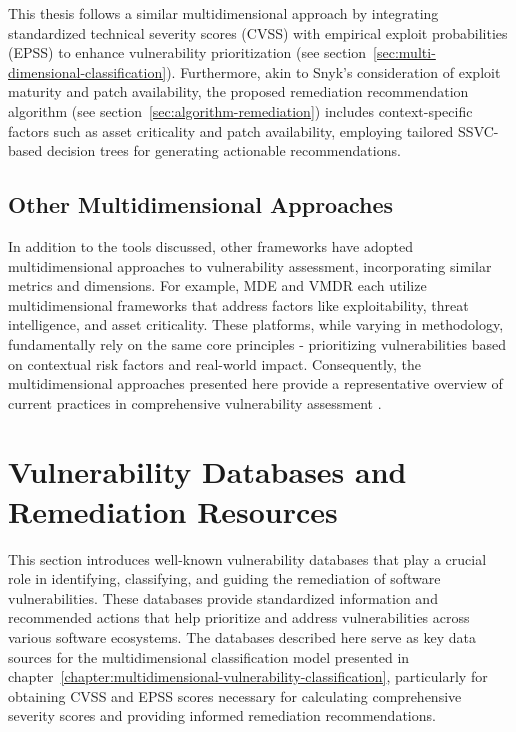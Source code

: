 This thesis follows a similar multidimensional approach by integrating standardized technical severity scores (\ac{CVSS}) with empirical exploit probabilities (\ac{EPSS}) to enhance vulnerability prioritization (see section~\ref{sec:multi-dimensional-classification}). Furthermore, akin to Snyk’s consideration of exploit maturity and patch availability, the proposed remediation recommendation algorithm (see section~\ref{sec:algorithm-remediation}) includes context-specific factors such as asset criticality and patch availability, employing tailored \ac{SSVC}-based decision trees for generating actionable recommendations.

\subsection{Other Multidimensional Approaches}
\label{subsec:other-multidimensional-approaches}

In addition to the tools discussed, other frameworks have adopted multidimensional approaches to vulnerability assessment, incorporating similar metrics and dimensions. For example, \ac{MDE} and \ac{VMDR} each utilize multidimensional frameworks that address factors like exploitability, threat intelligence, and asset criticality. These platforms, while varying in methodology, fundamentally rely on the same core principles - prioritizing vulnerabilities based on contextual risk factors and real-world impact. Consequently, the multidimensional approaches presented here provide a representative overview of current practices in comprehensive vulnerability assessment \autocite{microsoft_corporation_compare_2024, qualys_qualys_2022}.

\section{Vulnerability Databases and Remediation Resources}
\label{sec:vulnerability-databases-resources}

This section introduces well-known vulnerability databases that play a crucial role in identifying, classifying, and guiding the remediation of software vulnerabilities. These databases provide standardized information and recommended actions that help prioritize and address vulnerabilities across various software ecosystems. The databases described here serve as key data sources for the multidimensional classification model presented in chapter~\ref{chapter:multidimensional-vulnerability-classification}, particularly for obtaining \ac{CVSS} and \ac{EPSS} scores necessary for calculating comprehensive severity scores and providing informed remediation recommendations.


